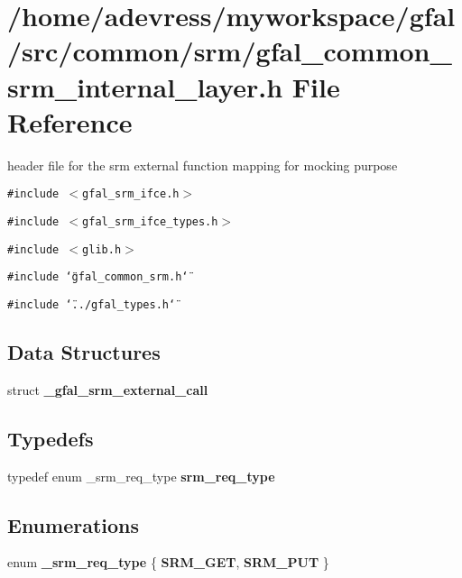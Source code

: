 \section{/home/adevress/myworkspace/gfal/src/common/srm/gfal\_\-common\_\-srm\_\-internal\_\-layer.h File Reference}
\label{gfal__common__srm__internal__layer_8h}
header file for the srm external function mapping for mocking purpose 

{\tt \#include $<$gfal\_\-srm\_\-ifce.h$>$}\par
{\tt \#include $<$gfal\_\-srm\_\-ifce\_\-types.h$>$}\par
{\tt \#include $<$glib.h$>$}\par
{\tt \#include \char`\"{}gfal\_\-common\_\-srm.h\char`\"{}}\par
{\tt \#include \char`\"{}../gfal\_\-types.h\char`\"{}}\par
\subsection*{Data Structures}
\begin{CompactItemize}
\item 
struct \bf{\_\-gfal\_\-srm\_\-external\_\-call}
\end{CompactItemize}
\subsection*{Typedefs}
\begin{CompactItemize}
\item 
typedef enum \_\-srm\_\-req\_\-type \textbf{srm\_\-req\_\-type}\label{gfal__common__srm__internal__layer_8h_916c9454af7600d1ab17c17a22fbc0fa}

\end{CompactItemize}
\subsection*{Enumerations}
\begin{CompactItemize}
\item 
enum \textbf{\_\-srm\_\-req\_\-type} \{ \textbf{SRM\_\-GET}, 
\textbf{SRM\_\-PUT}
 \}
\end{CompactItemize}
